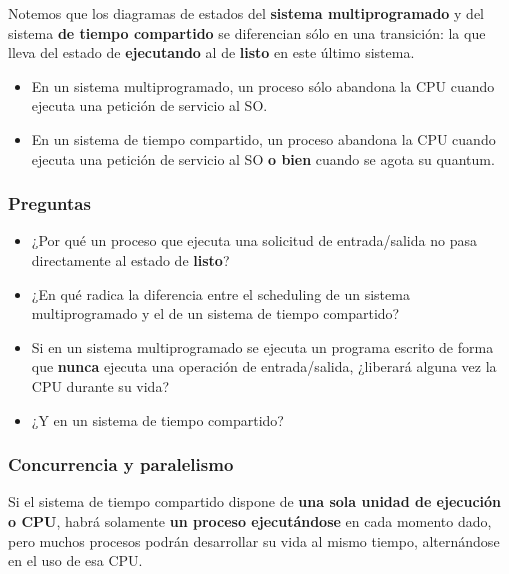 \documentclass[spanish,a4paper,]{article}
\providecommand{\tightlist}{%
  \setlength{\itemsep}{0pt}\setlength{\parskip}{0pt}}
\begin{document}
Notemos que los diagramas de estados del \textbf{sistema
multiprogramado} y del sistema \textbf{de tiempo compartido} se
diferencian sólo en una transición: la que lleva del estado de
\textbf{ejecutando} al de \textbf{listo} en este último sistema.

\begin{itemize}
\tightlist
\item
  En un sistema multiprogramado, un proceso sólo abandona la CPU cuando
  ejecuta una petición de servicio al SO.
\item
  En un sistema de tiempo compartido, un proceso abandona la CPU cuando
  ejecuta una petición de servicio al SO \textbf{o bien} cuando se agota
  su quantum.
\end{itemize}

\hypertarget{preguntas-1}{%
\subsubsection{Preguntas}\label{preguntas-1}}

\begin{itemize}
\tightlist
\item
  ¿Por qué un proceso que ejecuta una solicitud de entrada/salida no
  pasa directamente al estado de \textbf{listo}?
\item
  ¿En qué radica la diferencia entre el scheduling de un sistema
  multiprogramado y el de un sistema de tiempo compartido?
\item
  Si en un sistema multiprogramado se ejecuta un programa escrito de
  forma que \textbf{nunca} ejecuta una operación de entrada/salida,
  ¿liberará alguna vez la CPU durante su vida?
\item
  ¿Y en un sistema de tiempo compartido?
\end{itemize}

\hypertarget{concurrencia-y-paralelismo}{%
\subsubsection{Concurrencia y
paralelismo}\label{concurrencia-y-paralelismo}}

Si el sistema de tiempo compartido dispone de \textbf{una sola unidad de
ejecución o CPU}, habrá solamente \textbf{un proceso ejecutándose} en
cada momento dado, pero muchos procesos podrán desarrollar su vida al
mismo tiempo, alternándose en el uso de esa CPU.
\end{document}

